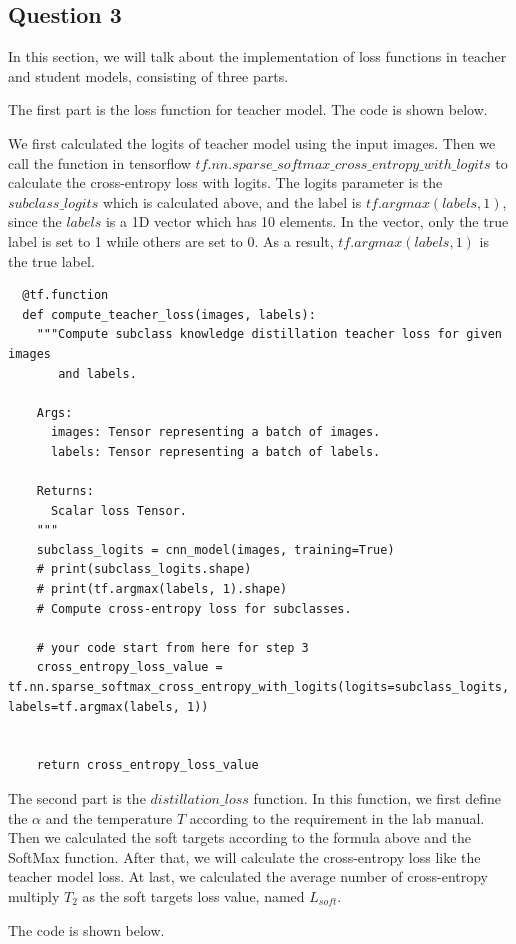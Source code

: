 \documentclass[conference]{IEEEtran}
\begin{document}
  \subsection{Question 3}
  In this section, we will talk about the implementation of loss functions in teacher and student models, consisting of three parts.\par
  The first part is the loss function for teacher model. The code is shown below.\par 
  We first calculated the logits of teacher model using the input images. Then we call the function in tensorflow $tf.nn.sparse\_softmax\_cross\_entropy\_with\_logits$ to calculate the cross-entropy loss with logits. 
  The logits parameter is the $subclass\_logits$ which is calculated above, and the label is $tf.argmax(labels, 1)$, since the $labels$ is a 1D vector which has 10 elements. In the vector, only the true label is set to 1 while others are set to 0.
  As a result, $tf.argmax(labels, 1)$ is the true label.
  \begin{lstlisting}
  @tf.function
  def compute_teacher_loss(images, labels):
    """Compute subclass knowledge distillation teacher loss for given images
       and labels.
  
    Args:
      images: Tensor representing a batch of images.
      labels: Tensor representing a batch of labels.
  
    Returns:
      Scalar loss Tensor.
    """
    subclass_logits = cnn_model(images, training=True)
    # print(subclass_logits.shape)
    # print(tf.argmax(labels, 1).shape)
    # Compute cross-entropy loss for subclasses.
  
    # your code start from here for step 3
    cross_entropy_loss_value = tf.nn.sparse_softmax_cross_entropy_with_logits(logits=subclass_logits, labels=tf.argmax(labels, 1))
  
  
    return cross_entropy_loss_value
  \end{lstlisting}
  The second part is the $distillation\_loss$ function. 
  In this function, we first define the $\alpha$ and the temperature $T$ according to the requirement in the lab manual.
  Then we calculated the soft targets according to the formula above and the SoftMax function.
  After that, we will calculate the cross-entropy loss like the teacher model loss.
  At last, we calculated the average number of cross-entropy multiply $T_{2}$ as the soft targets loss value, named $L_{soft}$.\par
  The code is shown below.
\end{document}
